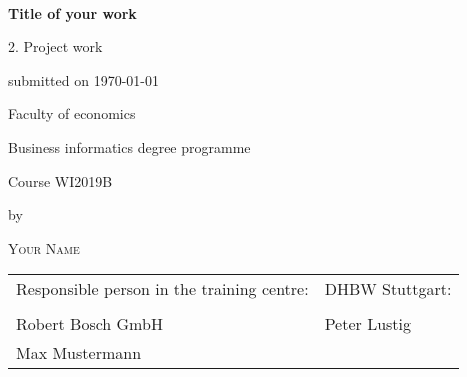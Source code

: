 \newcommand{\typMeinerArbeit}{2. Project work} 

\newcommand{\themaMeinerArbeit}{Title of your work}

\newcommand{\meinName}{Your Name}

\thispagestyle{empty}

\begin{spacing}{1}
\begin{center}	
~\vspace{0mm}

{\sffamily
\LARGE  
\textbf{\themaMeinerArbeit}

\bigskip

}


\vspace{15mm}

{\Large \typMeinerArbeit}

\vspace{1cm}

submitted on \today 

\vspace{15mm}

Faculty of economics
\medskip

Business informatics degree programme
\medskip

Course WI2019B 

\vspace{10mm}

by

\vspace{10mm}

{\large\textsc{\meinName}}

\vspace{10mm}
\end{center}

\vfill

\begin{tabular}{ll}
Responsible person in the training centre: & DHBW Stuttgart: \\
\hspace{0.4\linewidth} & \\
Robert Bosch GmbH &  Peter Lustig\\
Max Mustermann
\\


\end{tabular}
\end{spacing}
